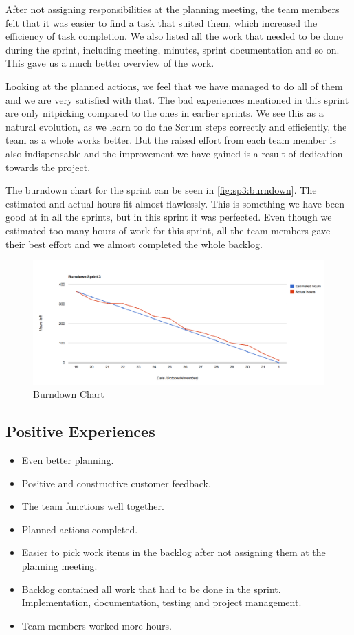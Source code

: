 After not assigning responsibilities at the planning meeting, the team members felt that it was easier to find a task that suited them, which increased the efficiency of task completion. We also listed all the work that needed to be done during the sprint, including meeting, minutes, sprint documentation and so on. This gave us a much better overview of the work.

Looking at the planned actions, we feel that we have managed to do all of them and we are very satisfied with that. The bad experiences mentioned in this sprint are only nitpicking compared to the ones in earlier sprints. We see this as a natural evolution, as we learn to do the Scrum steps correctly and efficiently, the team as a whole works better.
But the raised effort from each team member is also indispensable and the improvement we have gained is a result of dedication towards the project.

The burndown chart for the sprint can be seen in \autoref{fig:sp3:burndown}. The estimated and actual hours fit almost flawlessly. This is something we have been good at in all the sprints, but in this sprint it was perfected. Even though we estimated too many hours of work for this sprint, all the team members gave their best effort and we almost completed the whole backlog. 
\begin{figure}[!htb]
	\includegraphics[width=\textwidth]{./sprints/img/burndown_chart_s3}
	\caption{Burndown Chart\label{fig:sp3:burndown}}
\end{figure}

\subsection{Positive Experiences}
\begin{itemize}
	\item Even better planning.
	\item Positive and constructive customer feedback.
	\item The team functions well together.
	\item Planned actions completed.
	\item Easier to pick work items in the backlog after not assigning them at the planning meeting.
	\item Backlog contained all work that had to be done in the sprint. Implementation, documentation, testing and project management.
	\item Team members worked more hours. 
\end{itemize}

